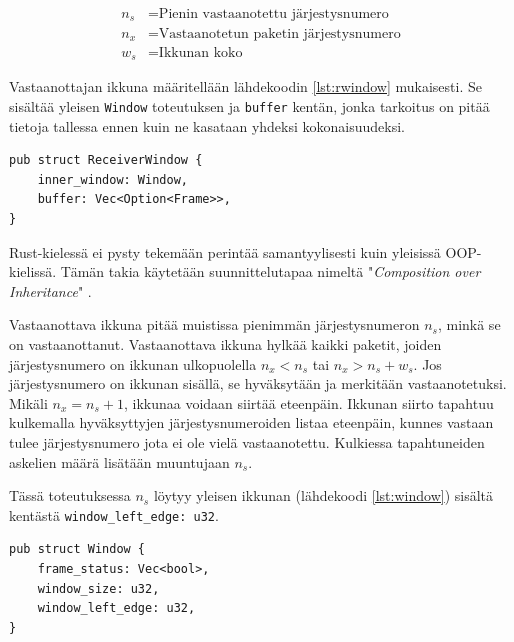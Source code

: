 \documentclass[a4paper,12pt]{article}
\begin{document}
    \begin{align}
        n_s &= \text{Pienin vastaanotettu järjestysnumero} \\
        n_x &= \text{Vastaanotetun paketin järjestysnumero} \\
        w_s &= \text{Ikkunan koko}
    \end{align}



    Vastaanottajan ikkuna määritellään lähdekoodin \ref{lst:rwindow} mukaisesti. Se sisältää yleisen \lstinline{Window} toteutuksen ja \lstinline{buffer} kentän, jonka tarkoitus on pitää tietoja
    tallessa ennen kuin ne kasataan yhdeksi kokonaisuudeksi. \par
    
\begin{lstlisting}[caption={Vastaanottajan ikkunan rakenne}, label={lst:rwindow}]
pub struct ReceiverWindow {
    inner_window: Window,
    buffer: Vec<Option<Frame>>,
}\end{lstlisting}

    Rust-kielessä ei pysty tekemään perintää samantyylisesti kuin yleisissä OOP-kielissä. Tämän takia
    käytetään suunnittelutapaa nimeltä "\textit{Composition over Inheritance}" \cite{Ivicevic202228Inheritance}.



    \begin{framed}
        Vastaanottava ikkuna pitää muistissa pienimmän järjestysnumeron $n_s$, minkä se on vastaanottanut.
        Vastaanottava ikkuna hylkää kaikki paketit, joiden järjestysnumero on ikkunan ulkopuolella $n_x < n_s$ tai $n_x > n_s + w_s$. Jos järjestysnumero on ikkunan sisällä, se hyväksytään ja merkitään vastaanotetuksi. Mikäli $n_x = n_s + 1$, ikkunaa voidaan siirtää eteenpäin.
        Ikkunan siirto tapahtuu kulkemalla hyväksyttyjen järjestysnumeroiden listaa eteenpäin, kunnes vastaan tulee järjestysnumero jota ei ole vielä vastaanotettu. Kulkiessa tapahtuneiden askelien määrä lisätään muuntujaan $n_s$.
    \end{framed}

    Tässä toteutuksessa $n_s$ löytyy yleisen ikkunan (lähdekoodi \ref{lst:window}) sisältä kentästä \lstinline{window_left_edge: u32}.

\begin{lstlisting}[caption={Ikkunan rakenne}, label={lst:window}]
pub struct Window {
    frame_status: Vec<bool>,
    window_size: u32,
    window_left_edge: u32,
}\end{lstlisting}
\end{document}
